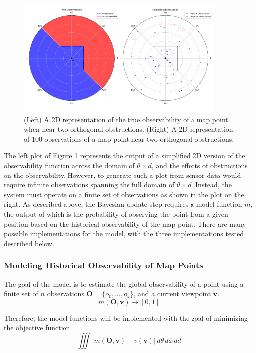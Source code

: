 \begin{figure}[!ht]
  \centering
  \includegraphics[width=0.9\textwidth]{resources/2d_observability.png}
  \caption[2D Observability]{(Left) A 2D representation of the true observability of a map point when near two orthogonal obstructions. (Right) A 2D representation of 100 observations of a map point near two orthogonal obstructions.}
  \label{fig:2d_observability}
\end{figure}

The left plot of Figure \ref{fig:2d_observability} represents the output of a simplified 2D version of the observability function across the domain of $\theta\times d$, and the effects of obstructions on the observability. However, to generate such a plot from sensor data would require infinite observations spanning the full domain of $\theta\times d$. Instead, the system must operate on a finite set of observations as shown in the plot on the right. As described above, the Bayesian update step requires a model function $m$, the output of which is the probability of observing the point from a given position based on the historical observability of the map point. There are many possible implementations for the model, with the three implementations tested described below.

\subsubsection{Modeling Historical Observability of Map Points}

The goal of the model is to estimate the global observability of a point using a finite set of $n$ observations $\boldsymbol{O} = \{o_0,\dots,o_n\}$, and a current viewpoint $\boldsymbol{v}$.
$$
  m(\boldsymbol{O},\boldsymbol{v})\to[0,1]
$$

Therefore, the model functions will be implemented with the goal of minimizing the objective function
$$
  \iiint |m(\boldsymbol{O},\boldsymbol{v}) - v(\boldsymbol{v})| \,d\theta\,d\phi\,dd
$$

